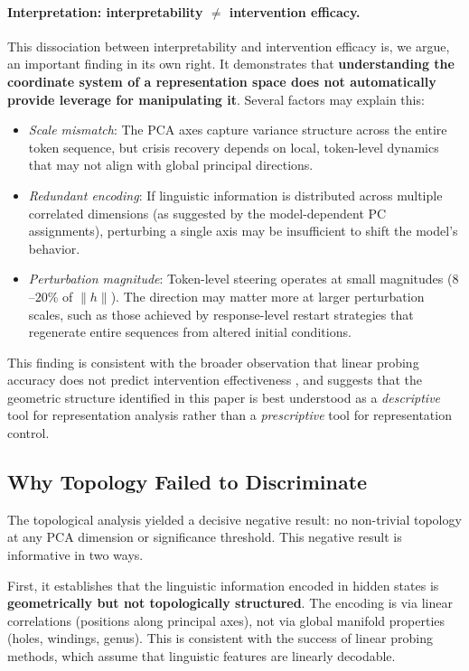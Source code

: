 \documentclass[11pt,a4paper]{article}
\begin{document}
\paragraph{Interpretation: interpretability $\neq$ intervention efficacy.} This dissociation between interpretability and intervention efficacy is, we argue, an important finding in its own right. It demonstrates that \textbf{understanding the coordinate system of a representation space does not automatically provide leverage for manipulating it}. Several factors may explain this:

\begin{itemize}
    \item \emph{Scale mismatch}: The PCA axes capture variance structure across the entire token sequence, but crisis recovery depends on local, token-level dynamics that may not align with global principal directions.
    \item \emph{Redundant encoding}: If linguistic information is distributed across multiple correlated dimensions (as suggested by the model-dependent PC assignments), perturbing a single axis may be insufficient to shift the model's behavior.
    \item \emph{Perturbation magnitude}: Token-level steering operates at small magnitudes ($8$--$20$\% of $\|h\|$). The direction may matter more at larger perturbation scales, such as those achieved by response-level restart strategies that regenerate entire sequences from altered initial conditions.
\end{itemize}

This finding is consistent with the broader observation that linear probing accuracy does not predict intervention effectiveness \citep{li2024inference}, and suggests that the geometric structure identified in this paper is best understood as a \emph{descriptive} tool for representation analysis rather than a \emph{prescriptive} tool for representation control.

\subsection{Why Topology Failed to Discriminate}

The topological analysis yielded a decisive negative result: no non-trivial topology at any PCA dimension or significance threshold. This negative result is informative in two ways.

First, it establishes that the linguistic information encoded in hidden states is \textbf{geometrically but not topologically structured}. The encoding is via linear correlations (positions along principal axes), not via global manifold properties (holes, windings, genus). This is consistent with the success of linear probing methods, which assume that linguistic features are linearly decodable.
\end{document}
